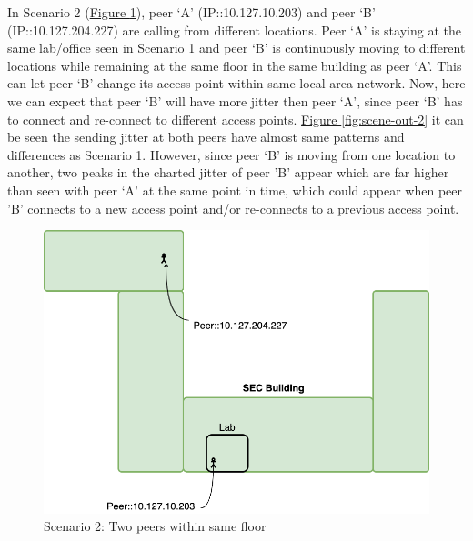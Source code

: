 	In Scenario 2 (\hyperref[fig:scene-2]{Figure \ref{fig:scene-2}}), peer `A' (IP::10.127.10.203) and peer `B' (IP::10.127.204.227) are calling from different locations. Peer `A' is staying at the same lab/office seen in Scenario 1 and peer `B' is continuously moving to different locations while remaining at the same floor in the same building as peer `A'. This can let peer `B' change its access point within same local area network. Now, here we can expect that peer `B' will have more jitter then peer `A', since peer `B' has to connect and re-connect to different access points. \hyperref[fig:scene-out-2]{Figure \ref{fig:scene-out-2}} it can be seen the sending jitter at both peers have almost same patterns and differences as Scenario 1. However, since peer `B' is moving from one location to another, two peaks in the charted jitter of peer 'B' appear which are far higher than seen with peer `A' at the same point in time, which could appear when peer 'B' connects to a new access point and/or re-connects to a previous access point.
	\begin{figure}[tbh]
		\begin{minipage}{\textwidth}
			\includegraphics[scale=0.29]{Images/experiment/senarios/in_floor.drawio.png}
		\end{minipage}
		\caption{Scenario 2: Two peers within same floor}
		\label{fig:scene-2}
	\end{figure}

